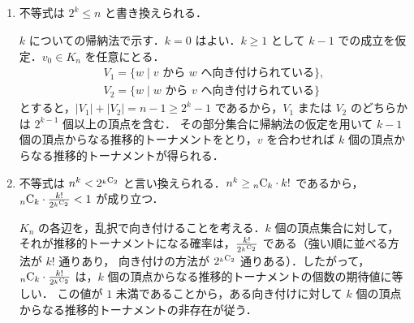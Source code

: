 \subsection{}
\begin{enumerate}
 \item 不等式は $2^k\leq n$ と書き換えられる．
 
 $k$ についての帰納法で示す．$k=0$ はよい．$k\geq 1$ として $k-1$ での成立を仮定．$v_0\in K_n$ を任意にとる．
 \begin{align*}
  V_1 = \{w\mid \text{$v$ から $w$ へ向き付けられている}\},\\
  V_2 = \{w\mid \text{$w$ から $v$ へ向き付けられている}\}
 \end{align*}
 とすると，$|V_1| + |V_2| = n-1 \geq 2^{k}-1$ であるから，$V_1$ または $V_2$ のどちらかは $2^{k-1}$ 個以上の頂点を含む．
 その部分集合に帰納法の仮定を用いて $k-1$ 個の頂点からなる推移的トーナメントをとり，$v$ を合わせれば $k$ 個の頂点からなる推移的トーナメントが得られる．
 \item 不等式は $n^k < 2^{{}_{k}\mathrm{C}_{2}}$ と言い換えられる．$n^k \geq {}_{n}\mathrm{C}_{k}\cdot k!$ であるから，${}_{n}\mathrm{C}_{k}\cdot \frac{k!}{2^{{}_{k}\mathrm{C}_{2}}} < 1$ が成り立つ．
 
 $K_n$ の各辺を，乱択で向き付けることを考える．$k$ 個の頂点集合に対して，それが推移的トーナメントになる確率は，$\frac{k!}{2^{{}_{k}\mathrm{C}_{2}}}$ である（強い順に並べる方法が $k!$ 通りあり，
 向き付けの方法が $2^{{}_{k}\mathrm{C}_{2}}$ 通りある）．したがって，${}_{n}\mathrm{C}_{k}\cdot \frac{k!}{2^{{}_{k}\mathrm{C}_{2}}}$ は，$k$ 個の頂点からなる推移的トーナメントの個数の期待値に等しい．
 この値が $1$ 未満であることから，ある向き付けに対して $k$ 個の頂点からなる推移的トーナメントの非存在が従う．
\end{enumerate}